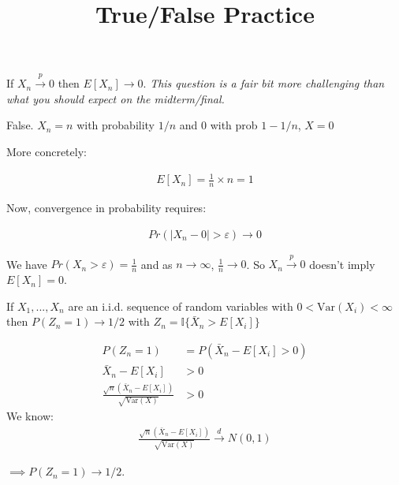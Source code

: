 \documentclass{exam}
\title{True/False Practice}
\begin{document}
\maketitle
    


\begin{questions}
    
\question If $X_n \xrightarrow{p} 0$ then $E[X_n] \rightarrow 0$. \textit{This 
question is a fair bit more challenging than what you should expect on the 
midterm/final.}
\begin{solution}
False. $X_n = n$ with probability $1/n$ and 0 with prob $1 - 1/n$,  $X = 0$

More concretely:

\begin{align*}
    E[X_n] = \frac{1}{n} \times n = 1
\end{align*}

Now, convergence in probability requires:

\begin{align*}
    Pr(|X_n - 0| > \varepsilon) \rightarrow 0
\end{align*}

    We have $Pr(X_n > \varepsilon) = \frac{1}{n}$ and as $n \rightarrow \infty$, 
    $\frac{1}{n} \rightarrow 0$. So $X_n \xrightarrow{p} 0$ doesn't imply $E[X_n] = 0$.
\end{solution}



\question If $X_1,...,X_n$ are an i.i.d. sequence of random variables with $0 < \text{Var}(X_i) < \infty$ then 
$P(Z_n = 1) \rightarrow 1/2$ with $Z_n = \mathbb{I}\{\bar{X}_n > E[X_i]\}$


\begin{solution}
    \begin{align*}
    P(Z_n = 1) &= P(\bar{X}_n - E[X_i] > 0) \\
    \bar{X}_n - E[X_i] &> 0 \\
    \frac{
        \sqrt{n}(\bar{X}_n - E[X_i])
    }{
        \sqrt{\text{Var}(X)}
    } &> 0 
    \end{align*}
    We know:
    \begin{align*}
    \frac{
        \sqrt{n}(\bar{X}_n - E[X_i])
    }{
        \sqrt{\text{Var}(X)}
    } \xrightarrow{d} N(0, 1)
    \end{align*}

    $\implies P(Z_n = 1) \rightarrow 1/2$.

\end{solution}





\end{questions}
\end{document}
